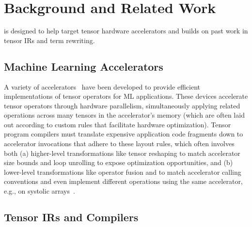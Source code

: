 \section{Background and Related Work}


\g is designed to help target
  tensor hardware accelerators and
  builds on past work in
  tensor IRs and term rewriting.



\subsection{Machine Learning Accelerators}

A variety of accelerators~\cite{
    jouppi2017tpu, chen2016eyeriss, moreau2018vta, markidis2018tensorcore, nvdla}
  have been developed 
  to provide efficient implementations
  of tensor operators for ML applications.
These devices accelerate tensor operators 
  through hardware parallelism, 
  simultaneously applying related operations
  across many tensors in the accelerator's memory (which are often laid out according to custom rules that facilitate hardware optimization).
Tensor program compilers must translate
  expensive application code fragments
  down to accelerator invocations that
  adhere to these layout rules,
  which often involves both
  (a) higher-level transformations like
  tensor reshaping to match accelerator size bounds and
  loop unrolling to expose optimization opportunities, and
  (b) lower-level transformations like
  operator fusion and 
  to match accelerator calling conventions and
  even implement different operations
  using the same accelerator,
  e.g., on systolic arrays~\cite{im2col, jia2014semantic}.
  

\subsection{Tensor IRs and Compilers}

